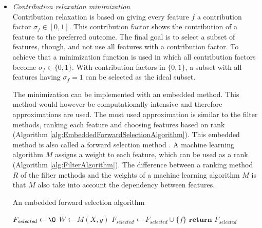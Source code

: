 \documentclass[10pt,a4paper]{report}
\begin{document}
	
	\begin{itemize}
		\item \textit{Contribution relaxation minimization} \\
		
		Contribution relaxation is based on giving every feature $f$ a contribution factor $\sigma_f \in [0, 1]$. This contribution factor shows the contribution of a feature to the preferred outcome. The final goal is to select a subset of features, though, and not use all features with a contribution factor. To achieve that a minimization function is used in which all contribution factors become $\sigma_f \in \{0, 1\}$. With contribution factors in $\{0, 1\}$, a subset with all features having $\sigma_f = 1$ can be selected as the ideal subset\cite{Lal2006}. 
		
		The minimization can be implemented with an embedded method. This method would however be computationally intensive and therefore approximations are used. The most used approximation is similar to the filter methods, ranking each feature and choosing features based on rank (Algorithm \ref{alg:EmbeddedForwardSelectionAlgorithm}). This embedded method is also called a forward selection method . A machine learning algorithm $M$ assigns a weight to each feature, which can be used as a rank (Algorithm \ref{alg:FilterAlgorithm}). The difference between a ranking method $R$ of the filter methods and the weights of a machine learning algorithm $M$ is that $M$ also take into account the dependency between features\cite{Lal2006}.
		
		\begin{algorithm}[H]
			\caption{An embedded forward selection algorithm\cite{Lal2006}}\label{alg:EmbeddedForwardSelectionAlgorithm}
			\begin{algorithmic}[1]
				\State $F_{\textit{selected}} \gets \O$ 	
				\State $W \gets M(X, y)$					
				 					
							
				\State $F_{\textit{selected}} \gets F_{\textit{selected}} \cup \{f\}$ 
				\EndIf
				\EndFor
				\State $\textbf{return } F_{\textit{selected}}$
				\EndProcedure
			\end{algorithmic}
		\end{algorithm}
		

\end{itemize}
\end{document}
